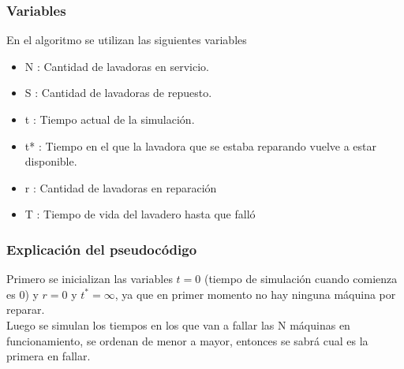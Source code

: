 \documentclass[11pt, spanish, a4paper]{article}
\begin{document}
\pagebreak

\subsubsection{Variables}
En el algoritmo se utilizan las siguientes variables
\begin{itemize}
	\item N : Cantidad de lavadoras en servicio.
	\item S : Cantidad de lavadoras de repuesto.
	\item t : Tiempo actual de la simulaci\'on.
	\item t* : Tiempo en el que la lavadora que se estaba reparando vuelve a estar disponible.
	\item r : Cantidad de lavadoras en reparaci\'on
	\item T : Tiempo de vida del lavadero hasta que fall\'o
\end{itemize}

\subsubsection{Explicaci\'on del pseudoc\'odigo}
Primero se inicializan las variables $t = 0$ (tiempo de simulaci\'on cuando comienza es 0) y $r = 0$ y $t^* = \infty$, ya que en primer momento no hay ninguna m\'aquina por reparar.\\
Luego se simulan los tiempos en los que van a fallar las N m\'aquinas en funcionamiento, se ordenan de menor a mayor, entonces se sabr\'a cual es la primera en fallar.\\
\end{document}
